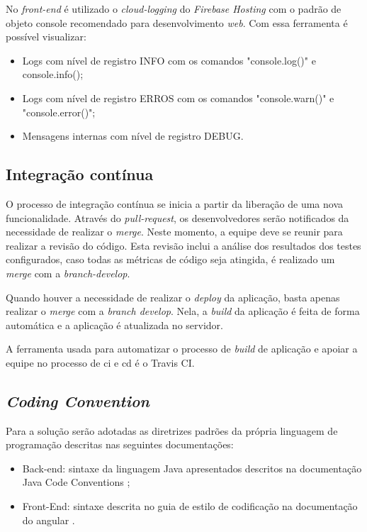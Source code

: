 \documentclass[
    12pt,               %
    openright,          %
    oneside,
    a4paper,            %
    english,            %
    brazil              %
    ]{ifsp-spo-inf-ctds} %
\begin{document}
No \textit{front-end} é utilizado o \textit{\gls{cloud-logging}} do \textit{Firebase Hosting} com o padrão de objeto console recomendado para desenvolvimento \textit{web}. Com essa ferramenta é possível visualizar:
\begin{itemize}
\item Logs com nível de registro INFO com os comandos "console.log()" e console.info();
\item Logs com nível de registro ERROS com os comandos "console.warn()" e "console.error()";
\item Mensagens internas com nível de registro DEBUG.
\end{itemize}

\subsection{Integração contínua}
O processo de integração contínua se inicia a partir da liberação de uma nova funcionalidade. Através do \textit{\gls{pull-request}}, os desenvolvedores serão notificados da necessidade de realizar o \textit{\gls{merge}}. Neste momento, a equipe deve se reunir para realizar a revisão do código. Esta revisão inclui a análise dos resultados dos testes configurados, caso todas as métricas de código seja atingida, é realizado um \textit{\gls{merge}} com a \textit{\gls{branch-develop}}. 


Quando houver a necessidade de realizar o \textit{\gls{deploy}} da aplicação, basta apenas realizar o \textit{merge} com a \textit{branch develop}. Nela, a \textit{\gls{build}} da aplicação é feita de forma automática e a aplicação é atualizada no servidor. 


A ferramenta usada para automatizar o processo de \textit{\gls{build}} de aplicação e apoiar a equipe no processo de \ac{ci} e \ac{cd} é o Travis CI.


\subsection{\textit{Coding Convention}}
Para a solução serão adotadas as diretrizes padrões da própria linguagem de programação descritas nas seguintes documentações:

\begin{itemize}
\item Back-end: sintaxe da linguagem Java  apresentados descritos na documentação Java Code Conventions \cite{javacodeconvention:1997};
\item Front-End: sintaxe descrita no guia de estilo de codificação na documentação do angular \cite{angularstyleguide:2021}.
\end{itemize}
\end{document}
